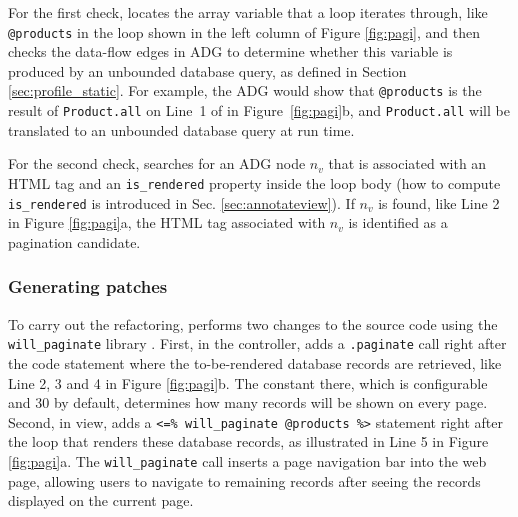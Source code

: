 For the first check, \Tool locates the array variable that a loop iterates through, like {\tt @products} in
the loop shown in the left column of Figure \ref{fig:pagi}, and then
checks the data-flow edges in ADG to determine 
whether this variable is produced by an unbounded database query, as defined in Section \ref{sec:profile_static}.
For example, the ADG would show that {\tt @products} is the result of {\tt Product.all} on
Line~1 of in Figure~\ref{fig:pagi}b, and {\tt Product.all} will be translated to
an unbounded database query 
at run time.

For the second check, \Tool searches for an ADG node $n_v$ that is associated with an HTML tag and an
{\tt is\_rendered} property inside the loop body (how to compute {\tt is\_rendered} is introduced in Sec. \ref{sec:annotateview}). If $n_v$ is found, like Line 2
in  Figure \ref{fig:pagi}a,
the HTML tag associated with $n_v$ is identified as a pagination candidate.

\subsubsection{Generating patches}
To carry out the refactoring,
\Tool performs two changes to the source code using the {\tt will\_paginate} library \cite{will_paginate}.
First, in the controller, \Tool adds a {\tt .paginate} call right after the
code statement where the to-be-rendered database records are retrieved, like
Line 2, 3 and 4 in  Figure \ref{fig:pagi}b. The constant there,
which is configurable and $30$ by default, 
determines how many records will be shown on every page.
Second, in view, \Tool adds a {\tt <=\% will\_paginate @products \%>} statement right
after the loop that renders these database records, as illustrated in Line 5 
 in Figure \ref{fig:pagi}a.
The {\tt will\_paginate} call inserts a page navigation bar into the web page, allowing users to navigate to remaining records after seeing the records displayed on the current page.



